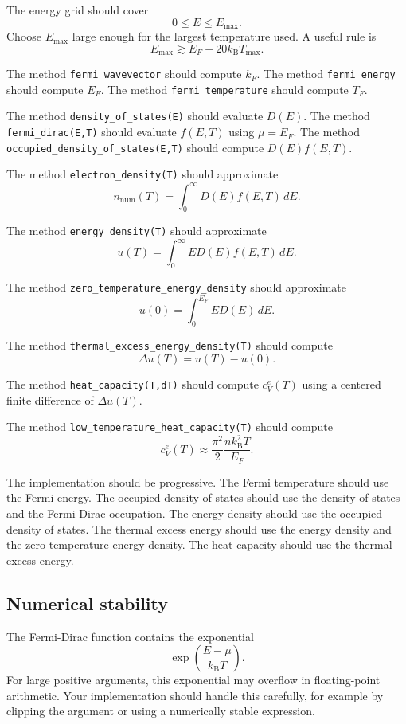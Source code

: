 The energy grid should cover
\[
0\le E\le E_{\max}.
\]
Choose \(E_{\max}\) large enough for the largest temperature used. A useful rule is
\[
E_{\max}\gtrsim E_F+20k_{\mathrm B}T_{\max}.
\]

The method \texttt{fermi\_wavevector} should compute \(k_F\). The method \texttt{fermi\_energy} should compute \(E_F\). The method \texttt{fermi\_temperature} should compute \(T_F\).

The method \texttt{density\_of\_states(E)} should evaluate \(D(E)\). The method \texttt{fermi\_dirac(E,T)} should evaluate \(f(E,T)\) using \(\mu=E_F\). The method \texttt{occupied\_density\_of\_states(E,T)} should compute \(D(E)f(E,T)\).

The method \texttt{electron\_density(T)} should approximate
\[
n_{\mathrm{num}}(T)
=
\int_0^\infty
D(E)f(E,T)\,dE.
\]

The method \texttt{energy\_density(T)} should approximate
\[
u(T)
=
\int_0^\infty
E D(E) f(E,T)\,dE.
\]

The method \texttt{zero\_temperature\_energy\_density} should approximate
\[
u(0)
=
\int_0^{E_F}
E D(E)\,dE.
\]

The method \texttt{thermal\_excess\_energy\_density(T)} should compute
\[
\Delta u(T)=u(T)-u(0).
\]

The method \texttt{heat\_capacity(T,dT)} should compute \(c_V^{e}(T)\) using a centered finite difference of \(\Delta u(T)\).

The method \texttt{low\_temperature\_heat\_capacity(T)} should compute
\[
c_V^{e}(T)
\approx
\frac{\pi^2}{2}
\frac{nk_{\mathrm B}^2T}{E_F}.
\]

The implementation should be progressive. The Fermi temperature should use the Fermi energy. The occupied density of states should use the density of states and the Fermi-Dirac occupation. The energy density should use the occupied density of states. The thermal excess energy should use the energy density and the zero-temperature energy density. The heat capacity should use the thermal excess energy.

\subsection{Numerical stability}

The Fermi-Dirac function contains the exponential
\[
\exp\left(\frac{E-\mu}{k_{\mathrm B}T}\right).
\]
For large positive arguments, this exponential may overflow in floating-point arithmetic. Your implementation should handle this carefully, for example by clipping the argument or using a numerically stable expression.

